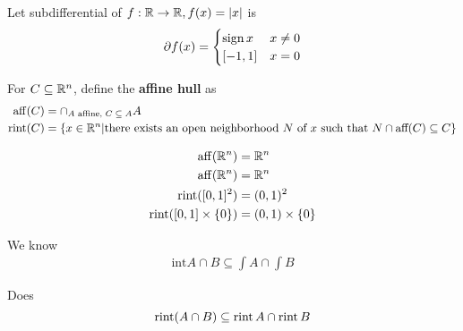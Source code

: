 \begin{exmp}
  \label{defn:cones_and_generalized_inequalities:4}
  Let subdifferential of $f: \mathbb{R} \rightarrow \mathbb{R}, f(x) = |x|$ is
  \begin{equation}
    \label{eq:40}
    \partial f(x) = \begin{cases}
      \operatorname*{sign} x & x \neq 0 \\
      [-1, 1] & x = 0
    \end{cases}
  \end{equation}
\end{exmp}


\begin{defn}
  \label{defn:cones_and_generalized_inequalities:5}
  For $C \subseteq \mathbb{R}^{n}$, define the \textbf{affine hull} as
  \begin{align}
    \operatorname*{aff}(C) &= \cap_{\text{$A$ affine, $C \subseteq A$}} A \\
    \operatorname*{rint}(C) &= \{ x \in \mathbb{R}^{n} | \text{there exists an open
      neighborhood $N$ of $x$ such that $N \cap \text{aff}(C)
      \subseteq C$} \}
  \end{align}
\end{defn}

\begin{exmp}
  \label{defn:cones_and_generalized_inequalities:6}
  \begin{align}
    \label{eq:42}
    \operatorname*{aff}(\mathbb{R}^{n}) &= \mathbb{R}^{n} \\
    \operatorname*{aff}(\mathbb{R}^{n}) &= \mathbb{R}^{n} \\
    \operatorname*{rint}([0, 1]^{2}) &= (0, 1)^{2} \\
    \operatorname*{rint}([0, 1] \times \{ 0 \}) &= (0, 1) \times \{ 0 \}
  \end{align}
\end{exmp}

\begin{exer}
  We know \begin{align}
    \label{eq:32}
    \text{int} A \cap B \subseteq \int A \cap \int B
  \end{align}

  Does
  \begin{equation}
    \label{eq:41}
    \operatorname*{rint}(A \cap B) \subseteq \operatorname*{rint} A \cap \operatorname*{rint} B
  \end{equation}

\end{exer}

